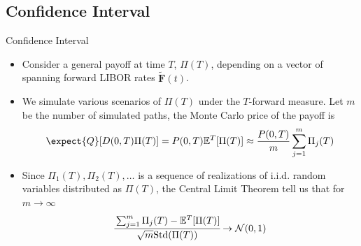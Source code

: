 \documentclass{beamer}
\begin{document}
\subsection{Confidence Interval}
\begin{frame}{Confidence Interval}
	\begin{itemize}
			\item<1-> Consider a general payoff at time $T$, $\Pi(T)$, depending on a vector of spanning forward LIBOR rates $\bm{\tilde{F}}(t)$. %
			\item<2-> We simulate various scenarios of $\Pi(T)$ under the $T$-forward measure. Let $m$ be the number of simulated paths, the Monte Carlo price of the payoff is
			\begin{equation*}
					\expect{Q}[D(0,T)\Pi(T)] = P(0,T)\mathbb{E}^T[\Pi(T)]\approx \frac{P(0,T)}{m}\sum_{j=1}^{m}\Pi_j(T)
				\end{equation*}
			\item<3-> Since $\Pi_1(T), \Pi_2(T),\ldots$ is a sequence of realizations of i.i.d. random variables distributed as $\Pi(T)$, the \textcolor{maincolor}{Central Limit Theorem} tell us that for $m\rightarrow\infty$
			\begin{equation*}
					\cfrac{\sum_{j=1}^{m}\Pi_j(T)-\mathbb{E}^T[\Pi(T)]}{\sqrt{m} \text{Std}(\Pi(T))}\rightarrow \mathcal{N}(0,1)
				\end{equation*}
		\end{itemize}
\end{frame}
\end{document}
